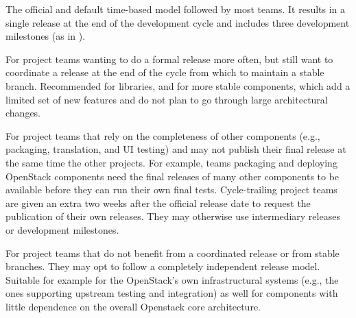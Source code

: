 \begin{description}[leftmargin=!]
\footnotesize
\item[Common cycle with development milestones] The official and default time-based model followed by most teams. It results in a single release at the end of the development cycle and includes three development milestones (as in ).

\item[Common cycle with intermediary releases] For project teams wanting to do a formal release more often, but still want to coordinate a release at the end of the cycle from which to maintain a stable branch. Recommended for libraries, and for more stable components, which add a limited set of new features and do not plan to go through large architectural changes.

\item[Trailing the common cycle]  For project teams that rely on the completeness of other components (e.g., packaging, translation, and UI testing) and may not publish their final release at the same time the other projects. For example, teams packaging and deploying OpenStack components need the final releases of many other components to be available before they can run their own final tests. Cycle-trailing project teams are given an extra two weeks after the official release date to request the publication of their own releases. They may otherwise use intermediary releases or development milestones. 

\item[Independent release model]  For project teams that do not benefit from a coordinated release or from stable branches. They may opt to follow a completely independent release model. Suitable for example for the OpenStack's own infrastructural systems (e.g., the ones supporting upstream testing and integration) as well for components with little dependence on the overall Openstack core architecture. 
\end{description}



